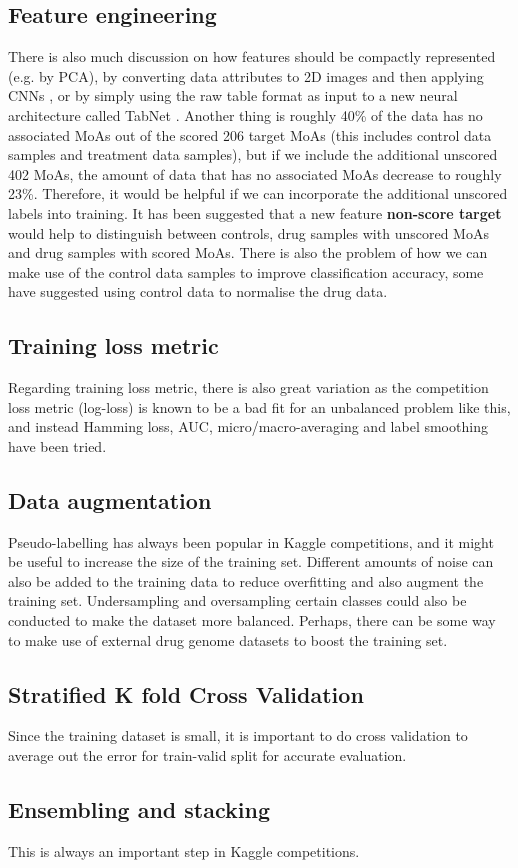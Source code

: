 \documentclass{article}
\begin{document}
\subsection{Feature engineering}
There is also much discussion on how features should be compactly represented (e.g. by PCA), by converting data attributes to 2D images and then applying CNNs \cite{genecnn}, or by simply using the raw table format as input to a new neural architecture called TabNet \cite{tabnet}. Another thing is roughly 40\% of the data has no associated MoAs out of the scored 206 target MoAs (this includes control data samples and treatment data samples), but if we include the additional unscored 402 MoAs, the amount of data that has no associated MoAs decrease to roughly 23\%. Therefore, it would be helpful if we can incorporate the additional unscored labels into training. It has been suggested that a new feature \textbf{non-score target} would help to distinguish between controls, drug samples with unscored MoAs and drug samples with scored MoAs. There is also the problem of how we can make use of the control data samples to improve classification accuracy, some have suggested using control data to normalise the drug data. 

\subsection{Training loss metric}
Regarding training loss metric, there is also great variation as the competition loss metric (log-loss) is known to be a bad fit for an unbalanced problem like this, and instead Hamming loss, AUC, micro/macro-averaging and label smoothing \cite{labelsmoothing} have been tried. 

\subsection{Data augmentation}
Pseudo-labelling has always been popular in Kaggle competitions, and it might be useful to increase the size of the training set. Different amounts of noise can also be added to the training data to reduce overfitting and also augment the training set. Undersampling and oversampling certain classes could also be conducted to make the dataset more balanced. Perhaps, there can be some way to make use of external drug genome datasets to boost the training set.

\subsection{Stratified K fold Cross Validation}
Since the training dataset is small, it is important to do cross validation to average out the error for train-valid split for accurate evaluation.

\subsection{Ensembling and stacking}
This is always an important step in Kaggle competitions.


\end{document}
